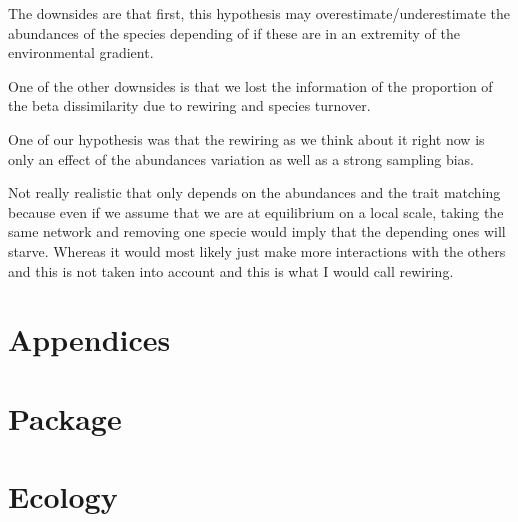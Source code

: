 \documentclass{article}
\begin{document}
The downsides are that first, this hypothesis may overestimate/underestimate the abundances of the species depending of if these are in an extremity of the environmental gradient.

One of the other downsides is that we lost the information of the proportion of the beta dissimilarity due to rewiring and species turnover. 

One of our hypothesis was that the rewiring as we think about it right now is only an effect of the abundances variation as well as a strong sampling bias.


Not really realistic that only depends on the abundances and the trait matching because even if we assume that we are at equilibrium on a local scale, taking the same network and removing one specie would imply that the depending ones will starve. Whereas it would most likely just make more interactions with the others and this is not taken into account and this is what I would call rewiring.


\section{Appendices}



\section{Package}



\section{Ecology}
\end{document}
